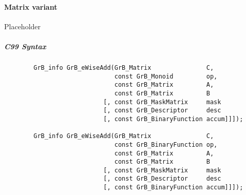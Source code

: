 
\paragraph{Matrix variant}

Placeholder



\subparagraph{C99 Syntax}

\begin{verbatim}
        GrB_info GrB_eWiseAdd(GrB_Matrix               C,
                              const GrB_Monoid         op, 
                              const GrB_Matrix         A,
                              const GrB_Matrix         B
                           [, const GrB_MaskMatrix     mask
                           [, const GrB_Descriptor     desc
                           [, const GrB_BinaryFunction accum]]]);
                            
        GrB_info GrB_eWiseAdd(GrB_Matrix               C,
                              const GrB_BinaryFunction op, 
                              const GrB_Matrix         A,
                              const GrB_Matrix         B
                           [, const GrB_MaskMatrix     mask
                           [, const GrB_Descriptor     desc
                           [, const GrB_BinaryFunction accum]]]);
\end{verbatim}

